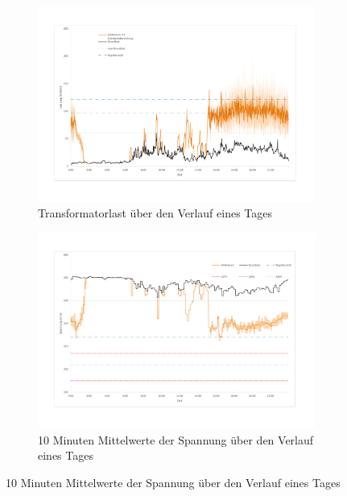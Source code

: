 \begin{figure}
	\begin{subfigure}{\linewidth}
		\includegraphics[scale=0.5]{img/SA_par_trafo/TrafoLast3.pdf}
		\caption{Transformatorlast über den Verlauf eines Tages}
		\label{Abb_SAparTrafo_TrafoLast}
	\end{subfigure}
	\begin{subfigure}{\linewidth}
		\includegraphics[scale=0.5]{img/SA_par_trafo/Voltage2.pdf}
		\caption{10 Minuten Mittelwerte der Spannung über den Verlauf eines Tages}
		\label{Abb_SaparTrafo_Spannung}
	\end{subfigure}
\end{figure}

